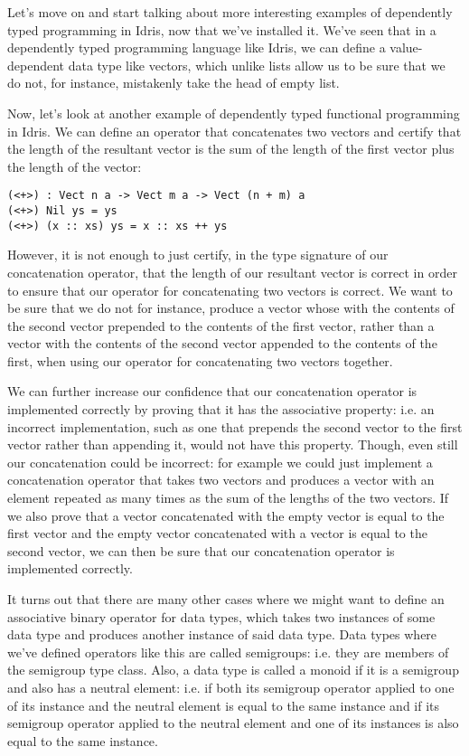 Let's move on and start talking about more interesting examples of
dependently typed programming in Idris, now that we've installed it.
We've seen that in a dependently typed programming language like Idris,
we can define a value-dependent data type like vectors, which unlike lists
allow us to be sure that we do not, for instance, mistakenly take the
head of empty list.

Now, let's look at another example of dependently typed functional programming
in Idris. We can define an operator that concatenates two vectors and certify
that the length of the resultant vector is the sum of the length of the
first vector plus the length of the vector:

\begin{lstlisting}
(<+>) : Vect n a -> Vect m a -> Vect (n + m) a
(<+>) Nil ys = ys
(<+>) (x :: xs) ys = x :: xs ++ ys
\end{lstlisting}

However, it is not enough to just certify, in the type signature of our concatenation operator,
that the length of our resultant vector is correct in order to ensure that our operator
for concatenating two vectors is correct. We want to be sure that we do not for instance,
produce a vector whose with the contents of the second vector prepended to the contents of
the first vector, rather than a vector with the contents of the second vector appended to the
contents of the first, when using our operator for concatenating two vectors together.

We can further increase our confidence that our concatenation operator is implemented
correctly by proving that it has the associative property: i.e. an incorrect implementation, such as
one that prepends the second vector to the first vector rather than appending it, would
not have this property. Though, even still our concatenation could be incorrect: for
example we could just implement a concatenation operator that takes two vectors and
produces a vector with an element repeated as many times as the sum of the lengths of the
two vectors. If we also prove that a vector concatenated with the empty vector is equal
to the first vector and the empty vector concatenated with a vector is equal to the second
vector, we can then be sure that our concatenation operator is implemented correctly.

It turns out that there are many other cases where we might want to define an associative
binary operator for data types, which takes two instances of some data type and produces another
instance of said data type. Data types where we've defined operators like this are called
semigroups: i.e. they are members of the semigroup type class. Also, a data type
is called a monoid if it is a semigroup and also has a neutral element: i.e. if
both its semigroup operator applied to one of its instance and the neutral element is equal
to the same instance and if its semigroup operator applied to the neutral element and one of
its instances is also equal to the same instance.
